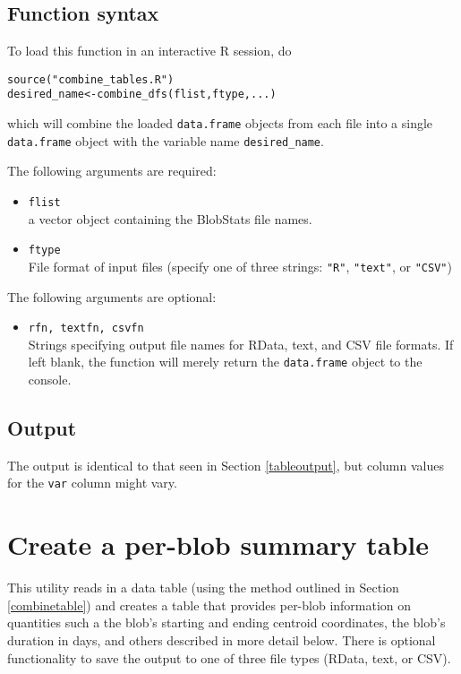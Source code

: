 \documentclass{article}
\begin{document}
\subsection{Function syntax}
To load this function in an interactive R session, do
\begin{verbatim}
source("combine_tables.R")
desired_name<-combine_dfs(flist,ftype,...)
\end{verbatim}

which will combine the loaded \texttt{data.frame} objects from each file into a single \texttt{data.frame} object with the variable name \texttt{desired\_name}.

The following arguments are required:
\begin{itemize}
\item[] \texttt{flist}\\ a vector object containing the BlobStats file names.
\item[] \texttt{ftype}\\ File format of input files (specify one of three strings: \texttt{"R"}, \texttt{"text"}, or \texttt{"CSV"})
\end{itemize}

The following arguments are optional:
\begin{itemize}
\item[] \texttt{rfn, textfn, csvfn}\\Strings specifying output file names for RData, text, and CSV file formats. If left blank, the function will merely return the \texttt{data.frame} object to the console.
\end{itemize}

\subsection{Output}
The output is identical to that seen in Section \ref{tableoutput}, but column values for the \texttt{var} column might vary.

\section{Create a per-blob summary table}
This utility reads in a data table (using the method outlined in Section \ref{combinetable}) and creates a table that provides per-blob information on quantities such a the blob's starting and ending centroid coordinates, the blob's duration in days, and others described in more detail below.  There is optional functionality to save the output to one of three file types (RData, text, or CSV).
\end{document}
